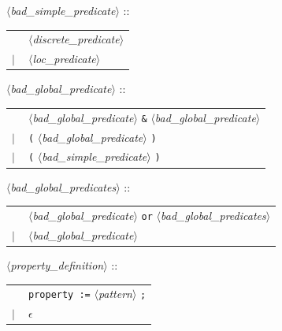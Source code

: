 \documentclass[a4paper,11pt]{report}
\newcommand{\emptystring}{$\epsilon$}
\newcommand{\nt}[1]{$\langle$\emph{#1}$\rangle$}
\newcommand{\regleGrammaire}[1]{\bigskip \noindent \nt{#1} :: \\}
\newcommand{\styleIMI}[1]{\textcolor{imicolor}{\texttt{#1}}}
\begin{document}
\regleGrammaire{bad\_simple\_predicate}
\begin{tabular}{l l}
	\  & \nt{discrete\_predicate} \\
	$|$ & \nt{loc\_predicate} \\
\end{tabular}


\regleGrammaire{bad\_global\_predicate}
\begin{tabular}{l l}
	\  & \nt{bad\_global\_predicate} \styleIMI{\&} \nt{bad\_global\_predicate} \\
	$|$ & \styleIMI{(} \nt{bad\_global\_predicate} \styleIMI{)} \\
	$|$ & \styleIMI{(} \nt{bad\_simple\_predicate} \styleIMI{)} \\
\end{tabular}


\regleGrammaire{bad\_global\_predicates}
\begin{tabular}{l l}
	\  & \nt{bad\_global\_predicate} \styleIMI{or} \nt{bad\_global\_predicates} \\
	$|$ & \nt{bad\_global\_predicate} \\
\end{tabular}


\regleGrammaire{property\_definition}
\begin{tabular}{l l}
	\  & \styleIMI{property :=} \nt{pattern} \styleIMI{;} \\
	$|$ & \emptystring \\
\end{tabular}
\end{document}

